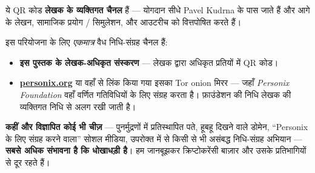 \begin{minipage}[t]{0.60\textwidth}
\vspace{0pt}
\begin{mdframed}[
  linewidth=0.7pt,roundcorner=5pt,
  innerleftmargin=10pt,innerrightmargin=10pt,
  innertopmargin=8pt,innerbottommargin=8pt,
  skipabove=0pt,skipbelow=0pt,
  linecolor=cbwarning!50,backgroundcolor=cbwarning!5,
  nobreak=true,
  needspace=4\baselineskip,
]
\footnotesize
ये QR कोड \textbf{लेखक के व्यक्तिगत चैनल} हैं --- योगदान सीधे Pavel Kudrna के पास जाते हैं और आगे के लेखन, सामाजिक प्रयोग / सिमुलेशन, और आउटरीच को वित्तपोषित करते हैं।

\smallskip
इस परियोजना के लिए \emph{एकमात्र} वैध निधि-संग्रह चैनल हैं:

\smallskip
\begin{itemize}
\setlength{\itemsep}{0pt}
\setlength{\topsep}{0pt}
\item \textbf{इस पुस्तक के लेखक-अधिकृत संस्करण} --- लेखक द्वारा अधिकृत प्रतियों में QR कोड।
\item \href{https://personix.org}{\textbf{personix.org}} या वहाँ से लिंक किया गया इसका Tor onion मिरर --- जहाँ \emph{Personix Foundation} वहाँ वर्णित गतिविधियों के लिए संग्रह करता है। फ़ाउंडेशन की निधि लेखक की व्यक्तिगत निधि से अलग रखी जाती है।
\end{itemize}

\smallskip
\textbf{कहीं और विज्ञापित कोई भी चीज़} --- पुनर्मुद्रणों में प्रतिस्थापित पते, हूबहू दिखने वाले डोमेन, ``Personix के लिए संग्रह करने वाला'' सोशल मीडिया, उपरोक्त में से किसी से भी असंबद्ध निधि-संग्रह अभियान --- \textbf{सबसे अधिक संभावना है कि धोखाधड़ी है}। हम जानबूझकर क्रिप्टोकरेंसी बाज़ार और उसके प्रतिभागियों से दूर रहते हैं।
\end{mdframed}
\end{minipage}

\clearpage
